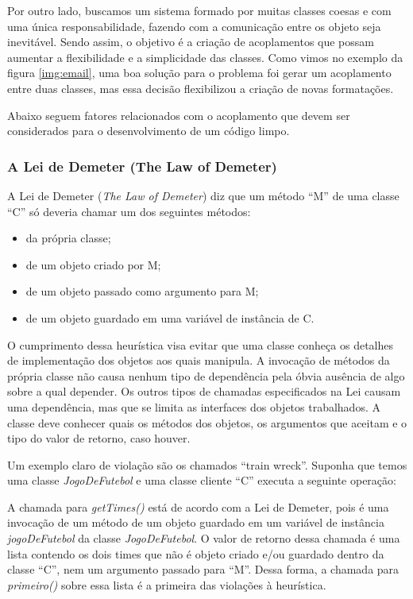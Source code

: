 Por outro lado, buscamos um sistema formado por muitas classes coesas e com uma única responsabilidade, fazendo com a comunicação entre os objeto seja inevitável. Sendo assim, o objetivo é a criação de acoplamentos que possam aumentar a flexibilidade e a simplicidade das classes. Como vimos no exemplo da figura \ref{img:email}, uma boa solução para o problema foi gerar um acoplamento entre duas classes, mas essa decisão flexibilizou a criação de novas formatações.

Abaixo seguem fatores relacionados com o acoplamento que devem ser considerados para o desenvolvimento de um código 
limpo.

\subsubsection{A Lei de Demeter (The Law of Demeter)}
A Lei de Demeter (\textit{The Law of Demeter}) diz que um método ``M'' de uma classe ``C'' só deveria chamar um dos 
seguintes métodos:

\begin{itemize}
	\item da própria classe;
	\item de um objeto criado por M;
	\item de um objeto passado como argumento para M;
	\item de um objeto guardado em uma variável de instância de C.
\end{itemize}

O cumprimento dessa heurística visa evitar que uma classe conheça os detalhes de implementação dos objetos aos quais 
manipula. A invocação de métodos da própria classe não causa nenhum tipo de dependência pela óbvia ausência de algo 
sobre a qual depender. Os outros tipos de chamadas especificados na Lei causam uma dependência, mas que se limita as 
interfaces dos objetos trabalhados. A classe deve conhecer quais os métodos dos objetos, os argumentos que aceitam e o 
tipo do valor de retorno, caso houver.
	
Um exemplo claro de violação são os chamados ``train wreck''. Suponha que temos uma classe \textit{JogoDeFutebol} e uma classe cliente ``C'' executa a seguinte operação:
	


A chamada para \textit{getTimes()} está de acordo com a Lei de Demeter, pois é uma invocação de um método de um objeto guardado em um variável de instância \textit{jogoDeFutebol} da classe \textit{JogoDeFutebol}. O valor de retorno dessa chamada é uma lista contendo os dois times que não é objeto criado e/ou guardado dentro da classe ``C'', nem um argumento passado para ``M''. Dessa forma, a chamada para \textit{primeiro()} sobre essa lista é a primeira das violações à heurística.
	
